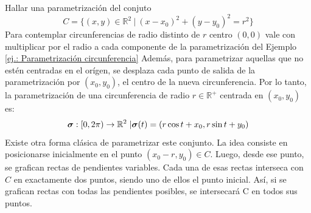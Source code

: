           \begin{example}    
        Hallar una parametrizaci\'on del conjuto 
          \begin{equation*}  
    C = \{  (x,y)  \in \mathbb{R}^2 \:|\:   (x-x_0)^2+(y-y_0)^2=r^2 \}
    \end{equation*} 
        Para contemplar circunferencias de radio distinto de $r$ centro $(0,0)$ vale con multiplicar por el radio a cada componente de la parametrización del Ejemplo \ref{ej.: Parametrización circunferencia}
        Además, para parametrizar aquellas que no estén centradas en el orígen, se desplaza cada punto de salida de la
        parametrización por $(x_0,y_0)$, el centro de la nueva circunferencia.
        Por lo tanto, la parametrización de una circunferencia de radio $r\in\mathbb{R}^+$ centrada en $(x_0,y_0)$ es:
        \begin{equation*}
            \boldsymbol{\sigma}:[0,2\pi)\rightarrow\mathbb{R}^2\;|\;\\ \boldsymbol{\sigma}(t)=(r\cos{t}+x_0,r\sin{t}+y_0)
        \end{equation*} 
        Existe otra forma clásica de parametrizar este conjunto. La idea consiste en posicionarse inicialmente en el punto $(x_0-r,y_0)\in C$.
        Luego, desde ese punto, se grafican rectas de pendientes variables. Cada una de esas rectas interseca con $C$ en exactamente dos puntos,
        siendo uno de ellos el punto inicial.  Así, si se grafican rectas con todas las pendientes posibles, se intersecará C en todos sus puntos.
            \begin{figure}[H]
      \begin{center}
\end{center}
\end{figure}
\end{example}

